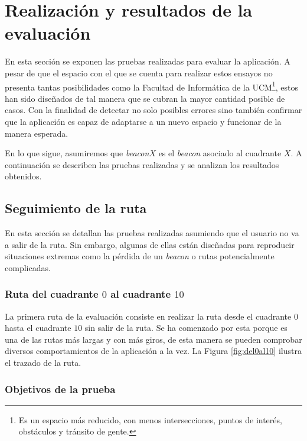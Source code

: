 \section{Realización y resultados de la evaluación}
\label{sec:realizYresult}

En esta sección se exponen las pruebas realizadas para evaluar la aplicación. A pesar de que el espacio con el que se cuenta para realizar estos ensayos no presenta tantas posibilidades como la Facultad de Informática de la UCM\footnote{Es un espacio más reducido, con menos intersecciones, puntos de interés, obstáculos y tránsito de gente.}, estos han sido diseñados de tal manera que se cubran la mayor cantidad posible de casos. Con la finalidad de detectar no solo posibles errores sino también confirmar que la aplicación es capaz de adaptarse a un nuevo espacio y funcionar de la manera esperada.

En lo que sigue, asumiremos que \textit{beacon$X$} es el \textit{beacon} asociado al cuadrante $X$. A continuación se describen las pruebas realizadas y se analizan los resultados obtenidos.

\subsection{Seguimiento de la ruta}
En esta sección se detallan las pruebas realizadas asumiendo que el usuario no va a salir de la ruta. Sin embargo, algunas de ellas están diseñadas para reproducir situaciones extremas como la pérdida de un \textit{beacon} o rutas potencialmente complicadas.


\subsubsection{Ruta del cuadrante $0$ al cuadrante $10$}
\label{subsub:0al10}
La primera ruta de la evaluación consiste en realizar la ruta desde el cuadrante $0$ hasta el cuadrante $10$ sin salir de la ruta. Se ha comenzado por esta porque es una de las rutas más largas y con más giros, de esta manera se pueden comprobar diversos comportamientos de la aplicación a la vez. La Figura \ref{fig:del0al10} ilustra el trazado de la ruta.


\subsubsection*{Objetivos de la prueba}

